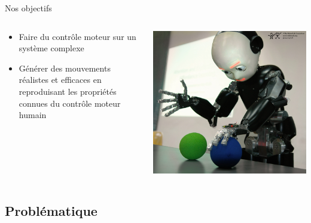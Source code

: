 \begin{frame}{Nos objectifs}
    \begin{columns}
        \begin{column}{0.50\textwidth}
            \begin{itemize}
                \item Faire du contrôle moteur sur un système complexe 
                \item Générer des mouvements réalistes et efficaces en reproduisant les propriétés connues du contrôle moteur humain
            \end{itemize}
        \end{column}
        \begin{column}{0.50\textwidth}
            \begin{center}
                \includegraphics[width=.95\linewidth]{fig/icub_light}
            \end{center}
        \end{column}
    \end{columns}
\end{frame}

\subsection*{Problématique}

